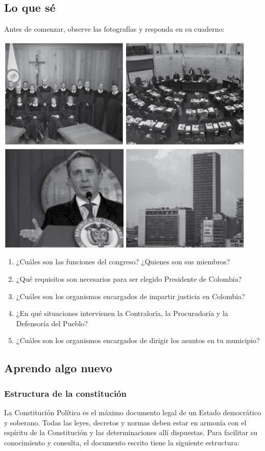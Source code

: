 \documentclass[10pt,twoside]{article}
\begin{document}
\subsection{Lo que s\'{e}}
Antes de comenzar, observe las fotograf\'{i}as y responda en su cuaderno:
\begin{center}
\includegraphics[scale=.75]{Images/congreso.png} 
\end{center}
\begin{enumerate}
\item ¿Cu\'{a}les son las funciones del congreso? ¿Quienes son sus miembros?
\item ¿Qu\'{e} requisitos son necesarios para ser elegido Presidente de Colombia?
\item ¿Cu\'{a}les son los organismos encargados de impartir justicia en Colombia?
\item ¿En qu\'{e} situaciones intervienen la Contralor\'{i}a, la Procurador\'{i}a y la Defensor\'{i}a del Pueblo?
\item ¿Cu\'{a}les son los organismos encargados de dirigir los asuntos en tu municipio?
\end{enumerate}
\subsection{Aprendo algo nuevo}
\subsubsection*{Estructura de la constituci\'{o}n}
La Constitución Política es el máximo documento legal de un Estado democrático y soberano. Todas las leyes, decretos y normas deben estar en armonía con el espíritu de la Constitución y las determinaciones allí dispuestas. Para facilitar su conocimiento y consulta, el documento escrito tiene la siguiente estructura:
\begin{center}
\end{center}
\end{document}
